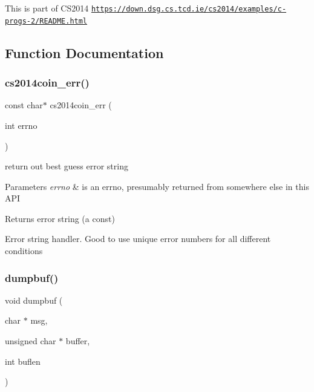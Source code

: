 This is part of C\+S2014 \href{https://down.dsg.cs.tcd.ie/cs2014/examples/c-progs-2/README.html}{\tt https\+://down.\+dsg.\+cs.\+tcd.\+ie/cs2014/examples/c-\/progs-\/2/\+R\+E\+A\+D\+M\+E.\+html} 

\subsection{Function Documentation}
\mbox{\label{cs2014coin-util_8c_af955b20ed8c88563e864ecca0b2e538e}} 
\subsubsection{\texorpdfstring{cs2014coin\+\_\+err()}{cs2014coin\_err()}}
{\footnotesize\ttfamily const char$\ast$ cs2014coin\+\_\+err (\begin{DoxyParamCaption}\item[{int}]{errno }\end{DoxyParamCaption})}



return out best guess error string 


\begin{DoxyParams}{Parameters}
{\em errno} & is an errno, presumably returned from somewhere else in this A\+PI \\
\hline
\end{DoxyParams}
\begin{DoxyReturn}{Returns}
error string (a const)
\end{DoxyReturn}
Error string handler. Good to use unique error numbers for all different conditions \mbox{\label{cs2014coin-util_8c_afd151090a1b9f8e9a800daa05be4bbf6}} 
\subsubsection{\texorpdfstring{dumpbuf()}{dumpbuf()}}
{\footnotesize\ttfamily void dumpbuf (\begin{DoxyParamCaption}\item[{char $\ast$}]{msg,  }\item[{unsigned char $\ast$}]{buffer,  }\item[{int}]{buflen }\end{DoxyParamCaption})}



